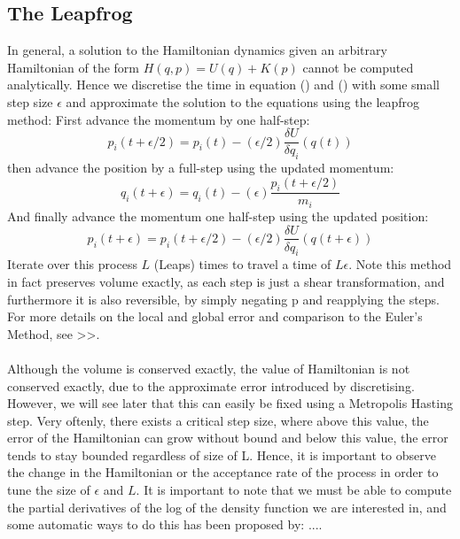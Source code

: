 \documentclass[11pt]{article}
\begin{document}
\subsection{The Leapfrog}
In general, a solution to the Hamiltonian dynamics given an arbitrary Hamiltonian of the form $H(q,p) = U(q) + K(p)$ cannot be computed analytically. Hence we discretise the time in equation () and () with some small step size $\epsilon$ and approximate the solution to the equations using the leapfrog method:
First advance the momentum by one half-step:
\begin{equation}
p_{i}(t+\epsilon/2) = p_{i}(t) - (\epsilon/2)\frac{\delta U}{\delta q_{i}}(q(t))
\end{equation}
then advance the position by a full-step using the updated momentum:
\begin{equation}
q_{i}(t+\epsilon) = q_{i}(t) - (\epsilon)\frac{p_{i}(t+\epsilon/2)}{m_{i}}
\end{equation}
And finally advance the momentum one half-step using the updated position:
\begin{equation}
p_{i}(t+\epsilon) = p_{i}(t+\epsilon/2) - (\epsilon/2)\frac{\delta U}{\delta q_{i}}(q(t+\epsilon))
\end{equation}
Iterate over this process $L$ (Leaps) times to travel a time of $L\epsilon$.
Note this method in fact preserves volume exactly, as each step is just a shear transformation, and furthermore it is also reversible, by simply negating p and reapplying the steps. For more details on the local and global error and comparison to the Euler's Method, see >>.
\\
\\
Although the volume is conserved exactly, the value of Hamiltonian is not conserved exactly, due to the approximate error introduced by discretising. However, we will see later that this can easily be fixed using a Metropolis Hasting step. Very oftenly, there exists a critical step size, where above this value, the error of the Hamiltonian can grow without bound and below this value, the error tends to stay bounded regardless of size of L. Hence, it is important to observe the change in the Hamiltonian or the acceptance rate of the process in order to tune the size of $\epsilon$ and $L$. It is important to note that we must be able to compute the partial derivatives of the log of the density function we are interested in, and some automatic ways to do this has been proposed by: ....
\end{document}

